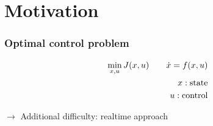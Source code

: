 \section{Motivation}
\begin{frame}
	\frametitle{Optimal control problem}
	\begin{block}{}
	  \begin{align*}
		\min_{x,u} J(x,u) \qquad \dot{x} = f(x,u) \\
		x: \textup{state} \\
		u: \textup{control} 
		\end{align*}
	\end{block}
	\vspace{1em}
	 \( \rightarrow \) Additional difficulty: realtime approach
\end{frame}